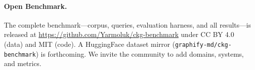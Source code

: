 \paragraph{Open Benchmark.}
The complete benchmark---corpus, queries, evaluation harness, and all
results---is released at
\url{https://github.com/Yarmoluk/ckg-benchmark}
under CC BY 4.0 (data) and MIT (code). A HuggingFace dataset mirror
(\texttt{graphify-md/ckg-benchmark}) is forthcoming. We invite the community to add
domains, systems, and metrics.
